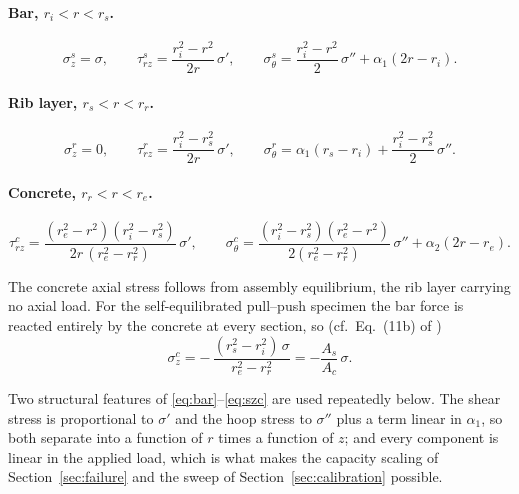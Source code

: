 \paragraph{Bar, $r_i < r < r_s$.}
\begin{equation}
\label{eq:bar}
\sigma_z^{s} = \sigma, \qquad
\tau_{rz}^{s} = \frac{r_i^2 - r^2}{2r}\,\sigma', \qquad
\sigma_\theta^{s} = \frac{r_i^2 - r^2}{2}\,\sigma'' + \alpha_1(2r - r_i).
\end{equation}

\paragraph{Rib layer, $r_s < r < r_r$.}
\begin{equation}
\label{eq:rib}
\sigma_z^{r} = 0, \qquad
\tau_{rz}^{r} = \frac{r_i^2 - r_s^2}{2r}\,\sigma', \qquad
\sigma_\theta^{r} = \alpha_1(r_s - r_i) + \frac{r_i^2 - r_s^2}{2}\,\sigma''.
\end{equation}

\paragraph{Concrete, $r_r < r < r_e$.}
\begin{equation}
\label{eq:conc}
\tau_{rz}^{c} = \frac{(r_e^2 - r^2)(r_i^2 - r_s^2)}{2r\,(r_e^2 - r_r^2)}\,\sigma',
\qquad
\sigma_\theta^{c} = \frac{(r_i^2 - r_s^2)(r_e^2 - r^2)}{2(r_e^2 - r_r^2)}\,\sigma''
                    + \alpha_2(2r - r_e).
\end{equation}

The concrete axial stress follows from assembly equilibrium, the rib layer
carrying no axial load. For the self-equilibrated pull--push specimen the bar
force is reacted entirely by the concrete at every section, so (cf.\ Eq.~(11b)
of \textcite{alaviAnalyticalProcedureFailure2025})
\begin{equation}
\label{eq:szc}
\sigma_z^{c} = -\,\frac{(r_s^2 - r_i^2)\,\sigma}{r_e^2 - r_r^2}
             = -\frac{A_s}{A_c}\,\sigma .
\end{equation}

Two structural features of \eqref{eq:bar}--\eqref{eq:szc} are used repeatedly
below. The shear stress is proportional to $\sigma'$ and the hoop stress to
$\sigma''$ plus a term linear in $\alpha_1$, so both separate into a function
of $r$ times a function of $z$; and every component is linear in the applied
load, which is what makes the capacity scaling of Section~\ref{sec:failure}
and the sweep of Section~\ref{sec:calibration} possible.

